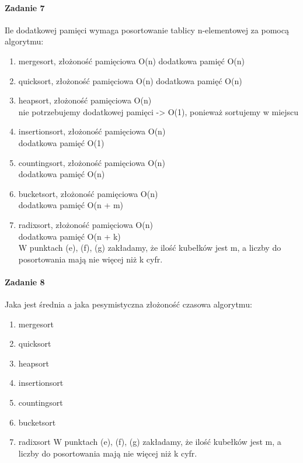 \documentclass[18pt]{extarticle}
\begin{document}
\paragraph{Zadanie 7} Ile dodatkowej pamięci wymaga posortowanie tablicy n-elementowej za pomocą algorytmu:
\begin{enumerate}[label=\alph*.]
    \item mergesort, złożoność pamięciowa O(n)
            dodatkowa pamięć O(n)
    \item quicksort, złożoność pamięciowa O(n)
            dodatkowa pamięć O(n)
    \item heapsort, złożoność pamięciowa O(n)\\
            nie potrzebujemy dodatkowej pamięci -> O(1), ponieważ sortujemy w miejscu
    \item insertionsort, złożoność pamięciowa O(n)\\
            dodatkowa pamięć O(1)
    \item countingsort, złożoność pamięciowa O(n)\\
            dodatkowa pamięć O(n)
    \item bucketsort, złożoność pamięciowa O(n)\\
            dodatkowa pamięć O(n + m)
    \item radixsort, złożoność pamięciowa O(n)\\
            dodatkowa pamięć O(n + k)\\

    W punktach (e), (f), (g) zakładamy, że ilość kubełków jest m, a liczby do posortowania mają nie więcej niż k cyfr.
\end{enumerate}

\paragraph{Zadanie 8} Jaka jest średnia a jaka pesymistyczna złożoność czasowa algorytmu:
\begin{enumerate}[label=\alph*]
    \item mergesort
    \item quicksort
    \item heapsort
    \item insertionsort
    \item countingsort
    \item bucketsort
    \item radixsort
    W punktach (e), (f), (g) zakładamy, że ilość kubełków jest m, a liczby do posortowania mają nie więcej niż k cyfr.
\end{enumerate}
\end{document}
